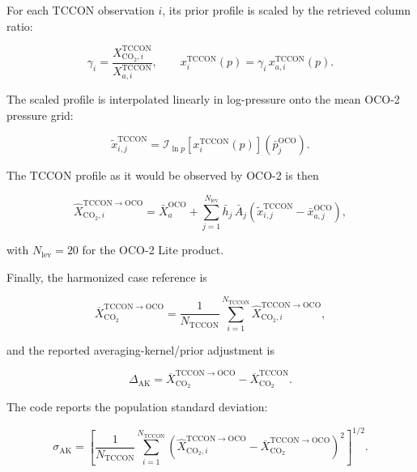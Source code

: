 For each TCCON observation \(i\), its prior profile is scaled by the retrieved column ratio:

\begin{equation}
\gamma_i =
\frac{X_{\mathrm{CO_2},i}^{\mathrm{TCCON}}}
     {X_{a,i}^{\mathrm{TCCON}}},
\qquad
x_i^{\mathrm{TCCON}}(p)
=
\gamma_i\,x_{a,i}^{\mathrm{TCCON}}(p).
\end{equation}


The scaled profile is interpolated linearly in log-pressure onto the mean OCO-2 pressure grid:

\begin{equation}
\tilde{x}_{i,j}^{\mathrm{TCCON}}
=
\mathcal{I}_{\ln p}
\left[
x_i^{\mathrm{TCCON}}(p)
\right]
\left(\bar{p}_j^{\mathrm{OCO}}\right).
\end{equation}


The TCCON profile as it would be observed by OCO-2 is then

\begin{equation}
\widehat{X}_{\mathrm{CO_2},i}^{\mathrm{TCCON}\rightarrow\mathrm{OCO}}
=
\bar{X}_{a}^{\mathrm{OCO}}
+
\sum_{j=1}^{N_{\mathrm{lev}}}
\bar{h}_j\,\bar{A}_j
\left(
\tilde{x}_{i,j}^{\mathrm{TCCON}}
-
\bar{x}_{a,j}^{\mathrm{OCO}}
\right),
\end{equation}

with \(N_{\mathrm{lev}}=20\) for the OCO-2 Lite product.

Finally, the harmonized case reference is

\begin{equation}
\overline{X}_{\mathrm{CO_2}}^{\mathrm{TCCON}\rightarrow\mathrm{OCO}}
=
\frac{1}{N_{\mathrm{TCCON}}}
\sum_{i=1}^{N_{\mathrm{TCCON}}}
\widehat{X}_{\mathrm{CO_2},i}^{\mathrm{TCCON}\rightarrow\mathrm{OCO}},
\end{equation}

and the reported averaging-kernel/prior adjustment is

\begin{equation}
\Delta_{\mathrm{AK}}
=
\overline{X}_{\mathrm{CO_2}}^{\mathrm{TCCON}\rightarrow\mathrm{OCO}}
-
\overline{X}_{\mathrm{CO_2}}^{\mathrm{TCCON}}.
\end{equation}


The code reports the population standard deviation:

\begin{equation}
\sigma_{\mathrm{AK}}
=
\left[
\frac{1}{N_{\mathrm{TCCON}}}
\sum_{i=1}^{N_{\mathrm{TCCON}}}
\left(
\widehat{X}_{\mathrm{CO_2},i}^{\mathrm{TCCON}\rightarrow\mathrm{OCO}}
-
\overline{X}_{\mathrm{CO_2}}^{\mathrm{TCCON}\rightarrow\mathrm{OCO}}
\right)^2
\right]^{1/2}.
\end{equation}


